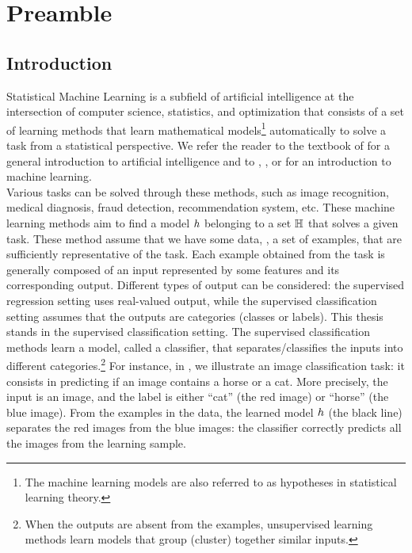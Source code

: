 \chapter*{Preamble}
\mtcaddchapter
\label{chap:prelim}


\section*{Introduction}

Statistical Machine Learning is a subfield of artificial intelligence at the intersection of computer science, statistics, and optimization that consists of a set of learning methods that learn mathematical models\footnote{The machine learning models are also referred to as hypotheses in statistical learning theory.} automatically to solve a task from a statistical perspective.
We refer the reader to the textbook of \citet{RussellNorvig2020} for a general introduction to artificial intelligence and to \citet{Bishop2007}, \citet{MohriRostamizadehTalwalkar2012}, or \citet{ShalevShwartzBenDavid2014} for an introduction to machine learning.\\

Various tasks can be solved through these methods, such as image recognition, medical diagnosis, fraud detection, recommendation system, etc.
These machine learning methods aim to find a model $h$ belonging to a set $\mathbb{H}$ that solves a given task.
These method assume that we have some data, \ie, a set of examples, that are sufficiently representative of the task.
Each example obtained from the task is generally composed of an input represented by some features and its corresponding output.
Different types of output can be considered: the supervised regression setting uses real-valued output, while the supervised classification setting assumes that the outputs are categories (\aka classes or labels). 
This thesis stands in the supervised classification setting.
The supervised classification methods learn a model, called a classifier, that separates/classifies the inputs into different categories.\footnote{When the outputs are absent from the examples, unsupervised learning methods learn models that group (\ie cluster) together similar inputs.}
For instance, in , we illustrate an image classification task: it consists in predicting if an image contains a horse or a cat.
More precisely, the input is an image, and the label is either ``cat'' (the red image) or ``horse'' (the blue image).
From the examples in the data, the learned model $h$ (the black line) separates the red images from the blue images: the classifier correctly predicts all the images from the learning sample.\\

